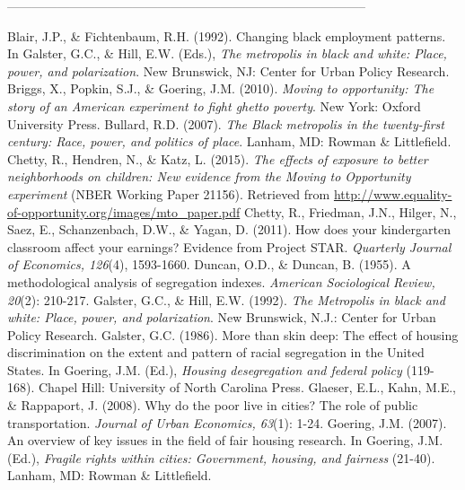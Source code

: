 \documentclass[paper=letter, fontsize=12pt]{scrartcl} %
\begin{document}
	
	--------------------------------------------------------------------------------------
	\clearpage
	
	
	\medskip
	
	\begin{thebibliography}{9}
		Blair, J.P., \& Fichtenbaum, R.H. (1992). Changing black employment patterns. In Galster, G.C., \& Hill, E.W. (Eds.), \textit{The metropolis in black and white: Place, power, and polarization}. New Brunswick, NJ: Center for Urban Policy Research.
		Briggs, X., Popkin, S.J., \& Goering, J.M. (2010). \textit{Moving to opportunity: The story of an American experiment to fight ghetto poverty}. New York: Oxford University Press.
		Bullard, R.D. (2007). \textit{The Black metropolis in the twenty-first century: Race, power, and politics of place}. Lanham, MD: Rowman \& Littlefield.
		Chetty, R., Hendren, N., \& Katz, L. (2015). \textit{The effects of exposure to better neighborhoods on children: New evidence from the Moving to Opportunity experiment} (NBER Working Paper 21156). Retrieved from \href{http://www.equality-of-opportunity.org/images/mto_paper.pdf}{http://www.equality-of-opportunity.org/images/mto\_paper.pdf}
		Chetty, R., Friedman, J.N., Hilger, N., Saez, E., Schanzenbach, D.W., \& Yagan, D. (2011). How does your kindergarten classroom affect your earnings? Evidence from Project STAR. \textit{Quarterly Journal of Economics, 126}(4), 1593-1660.
		Duncan, O.D., \& Duncan, B. (1955). A methodological analysis of segregation indexes. \textit{American Sociological Review, 20}(2): 210-217.
		Galster, G.C., \& Hill, E.W. (1992). \textit{The Metropolis in black and white: Place, power, and polarization}. New Brunswick, N.J.: Center for Urban Policy Research.
		Galster, G.C. (1986). More than skin deep: The effect of housing discrimination on the extent and pattern of racial segregation in the United States. In Goering, J.M. (Ed.), \textit{Housing desegregation and federal policy} (119-168). Chapel Hill: University of North Carolina Press.
		Glaeser, E.L., Kahn, M.E., \& Rappaport, J. (2008). Why do the poor live in cities? The role of public transportation. \textit{Journal of Urban Economics, 63}(1): 1-24.
		Goering, J.M. (2007). An overview of key issues in the field of fair housing research. In Goering, J.M. (Ed.), \textit{Fragile rights within cities: Government, housing, and fairness} (21-40). Lanham, MD: Rowman \& Littlefield.

\end{thebibliography}
\end{document}
